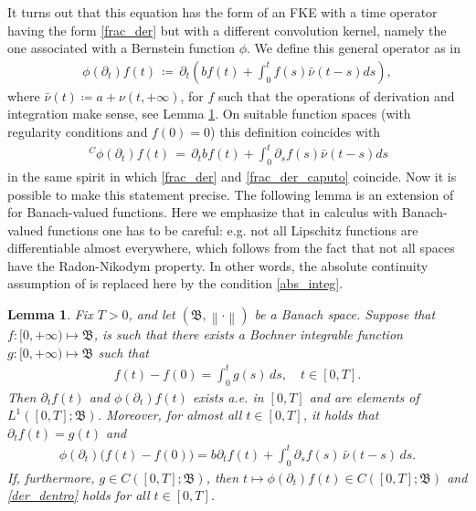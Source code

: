 \documentclass[reqno]{amsart}
\newtheorem{lemma}[theorem]{Lemma}
\theoremstyle{remark}
\numberwithin{equation}{section} %
\newcommand{\1}{\mathds{1}}
\begin{document}
	
	It turns out that this equation has the form of an FKE with a time operator having the form \eqref{frac_der} but with a different convolution kernel, namely the one associated with a Bernstein function $\phi$. We define this general operator as in \cite[Definition 2.1]{toaldo_pota}
	\begin{align}
		\phi(\partial_t) f(t) \, \coloneqq \, \partial_t \left( b f(t) + \int_0^t f(s) \bar{\nu}(t-s) ds \right),
		\label{conv_der}
	\end{align}
	where $\bar{\nu}(t) \coloneqq a+\nu(t, +\infty)$, for $f$ such that the operations of derivation and integration make sense, see Lemma \ref{equiv_def}. On suitable function spaces (with regularity conditions and $f(0)=0$) this definition coincides with
	\begin{align}
		\,^C\phi(\partial_t)f(t) \, = \,\partial_t b f(t) + \int_0^t \partial_s f(s) \bar{\nu}(t-s) ds 
		\label{conv_der_toa}
	\end{align}
	in the same spirit in which \eqref{frac_der} and \eqref{frac_der_caputo} coincide. 
	Now it is possible to make this statement precise. The following lemma is an extension of \cite[Lemma 2.4]{moving} for Banach-valued functions.
	Here we emphasize that in calculus with Banach-valued functions one has to be careful: e.g. not all Lipschitz functions are differentiable almost everywhere, which follows from the fact that not all spaces have the Radon-Nikodym property. In other words, the absolute continuity assumption of \cite[Lemma 2.4]{moving} is replaced here by the condition \eqref{abs_integ}.
	\begin{lemma}
		\label{equiv_def}
		Fix $T>0$, and let $(\mathfrak{B}, \left\| \cdot \right\|)$ be a Banach space. Suppose that $f: [0, +\infty) \mapsto \mathfrak{B}$,  is such that there exists a Bochner integrable function $g: [0, +\infty) \mapsto \mathfrak{B}$ such that
		\begin{align}\label{abs_integ}
			f(t) - f(0) = \int_0^t g(s) \, ds,\quad t \in [0,T].
		\end{align}
		Then $\partial_tf(t)$ and $\phi(\partial_t) f(t)$ exists a.e. in $[0,T]$ and are elements of $L^1([0,T]; \mathfrak{B})$. Moreover, for almost all $t\in [0,T]$, it holds that $\partial_tf(t)=g(t)$ and
		\begin{align}
			\phi(\partial_t)\big(f(t)-f(0)\big) = b \partial_tf(t) + \int_0^t \partial_sf(s) \, \bar{\nu}(t-s) \, ds.
			\label{der_dentro}
		\end{align}
		If, furthermore, $g\in C([0,T]; \mathfrak{B})$, then $t \mapsto \phi(\partial_t ) f(t) \in C([0,T]; \mathfrak{B})$ and \eqref{der_dentro} holds for all $t\in [0,T]$.
		
	\end{lemma}
\end{document}

